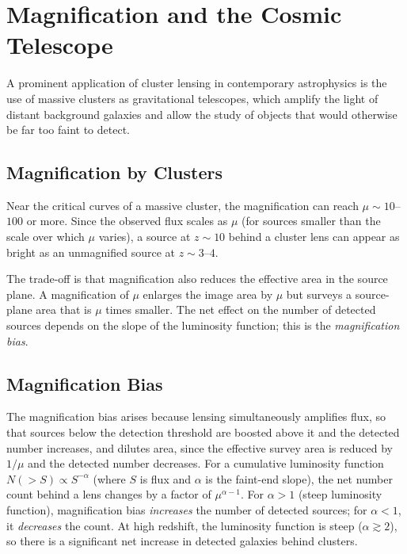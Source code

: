 \section{Magnification and the Cosmic Telescope}
\label{sec:cosmic_telescope}

A prominent application of cluster lensing in contemporary
astrophysics is the use of massive clusters as gravitational
telescopes, which amplify the light of distant background galaxies
and allow the study of objects that would otherwise be far too faint
to detect.

\subsection{Magnification by Clusters}

Near the critical curves of a massive cluster, the magnification can
reach $\mu \sim 10$--$100$ or more.  Since the observed flux scales as
$\mu$ (for sources smaller than the scale over which $\mu$ varies),
a source at $z \sim 10$ behind a cluster lens can appear as bright as
an unmagnified source at $z \sim 3$--$4$.

The trade-off is that magnification also reduces the effective area
in the source plane.  A magnification of $\mu$ enlarges the image
area by $\mu$ but surveys a source-plane area that is $\mu$ times
smaller.  The net effect on the number of detected sources depends on
the slope of the luminosity function; this is the
\emph{magnification bias}.

\subsection{Magnification Bias}

The magnification bias arises because lensing simultaneously
amplifies flux, so that sources below the detection threshold are
boosted above it and the detected number increases, and dilutes
area, since the effective survey area is reduced by $1/\mu$ and the
detected number decreases.
For a cumulative luminosity function $N(>S) \propto S^{-\alpha}$
(where $S$ is flux and $\alpha$ is the faint-end slope), the net
number count behind a lens changes by a factor of
$\mu^{\alpha - 1}$.  For $\alpha > 1$ (steep luminosity function),
magnification bias \textit{increases} the number of detected sources;
for $\alpha < 1$, it \textit{decreases} the count.  At high
redshift, the luminosity function is steep ($\alpha \gtrsim 2$), so
there is a significant net increase in detected galaxies behind
clusters.

